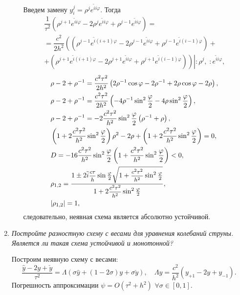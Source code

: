 \documentclass[12pt, a4paper]{article}
\begin{document}
\begin{enumerate}
\begin{enumerate}
			Введем замену $y_i^j=\rho^je^{\tilde i i \varphi}$. Тогда
			\begin{multline*}
				\dfrac1{\tau^2}\left(\rho^{j+1}e^{\tilde i i \varphi} - 2\rho^je^{\tilde i i \varphi} + \rho^{j-1}e^{\tilde i i \varphi}\right) =\\= \dfrac{c^2}{2h^2} \left(\left(\rho^{j-1}e^{\tilde i (i+1) \varphi} -2 \rho^{j-1}e^{\tilde i i \varphi} + \rho^{j-1}e^{\tilde i (i-1) \varphi}\right)\right.+\\+\left.\left(\rho^{j+1}e^{\tilde i (i+1) \varphi} -2 \rho^{j+1}e^{\tilde i i \varphi} + \rho^{j+1}e^{\tilde i (i-1) \varphi}\right)\right)\left.\right|:\rho^{j},\;:e^{\tilde i i \varphi},
			\end{multline*}
			\begin{eqnarray*}
				\centering
				&\rho-2+\rho^{-1}=\dfrac{c^2\tau^2}{2h^2}\left(2\rho^{-1}\cos\varphi-2\rho^{-1}+2\rho\cos\varphi-2\rho\right),\\
				&\rho-2+\rho^{-1}=\dfrac{c^2\tau^2}{2h^2}\left(-4\rho^{-1}\sin^2\frac{\varphi}{2}-4\rho\sin^2\frac{\varphi}{2}\right),\\
				&\rho-2+\rho^{-1}=-2\dfrac{c^2\tau^2}{h^2}\sin^2\frac{\varphi}{2}\left(\rho^{-1}+\rho\right),\\
				&\left(1+2\dfrac{c^2\tau^2}{h^2}\sin^2\frac{\varphi}{2}\right)\rho^2-2\rho+\left(1+2\dfrac{c^2\tau^2}{h^2}\sin^2\frac{\varphi}{2}\right)=0,\\
				& D = -16\dfrac{c^2\tau^2}{h^2}\sin^2\frac{\varphi}{2}\left(1+\dfrac{c^2\tau^2}{h^2}\sin^2\frac{\varphi}{2}\right)<0,\\
				&\rho_{1,2} = \dfrac{1\pm2\tilde i \sfrac{c\tau}{h}\sin \frac{\varphi}{2}\sqrt{1+\sfrac{c^2\tau^2}{h^2}\sin^2\frac{\varphi}{2}}}{1+2\sfrac{c^2 \tau^2}{h^2}\sin^2 \frac{\varphi}{2}},\\
				&|\rho_{1,2}| = 1,
			\end{eqnarray*}	
			следовательно, неявная схема является абсолютно устойчивой.
	\end{enumerate}
		\item \textit{Постройте разностную схему с весами для уравнения колебаний струны.\\ Является ли такая схема устойчивой и монотонной?}
		\smallskip
		
		Построим неявную схему с весами:
	\[
	\frac{\hat y-2y+\check y}{\tau^2}=\Lambda\left(\sigma\hat y+(1-2\sigma)y+\sigma \check y\right),\quad \Lambda y= \frac{c^2}{h^2}(y_{+1}-2y+y_{-1}).
	\]
	Погрешность аппроксимации $\psi=O(\tau^2+h^2)$ $\forall\sigma\in[0,1]$.
	

\end{enumerate}
\end{document}
